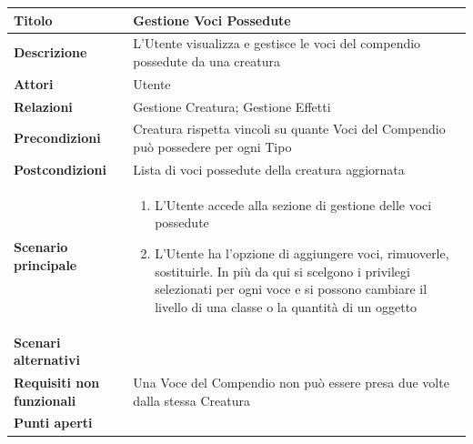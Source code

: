 \documentclass[a4paper, 11pt]{article}
\begin{document}
\begin{center}
\begin{tabular}{ |p{5cm}|p{9.5cm}|  }
\hline
\textbf{Titolo} & Gestione Voci Possedute \\
\hline
\textbf{Descrizione} & L'Utente visualizza e gestisce le voci del compendio possedute da una creatura \\
\hline
\textbf{Attori} & Utente \\
\hline
\textbf{Relazioni} & Gestione Creatura; Gestione Effetti \\
\hline
\textbf{Precondizioni} & Creatura rispetta vincoli su quante Voci del Compendio può possedere per ogni Tipo \\
\hline
\textbf{Postcondizioni} & Lista di voci possedute della creatura aggiornata \\
\hline
\textbf{Scenario principale} & 
\begin{enumerate}
    \item L'Utente accede alla sezione di gestione delle voci possedute
    \item L'Utente ha l'opzione di aggiungere voci, rimuoverle, sostituirle. In più da qui si scelgono i privilegi selezionati per ogni voce e si possono cambiare il livello di una classe o la quantità di un oggetto
\end{enumerate}\\
\hline
\textbf{Scenari alternativi} & \\
\hline
\textbf{Requisiti non funzionali} & Una Voce del Compendio non può essere presa due volte dalla stessa Creatura\\
\hline
\textbf{Punti aperti} & \\
\hline
\end{tabular}

\vspace{3em}


\end{center}
\end{document}
